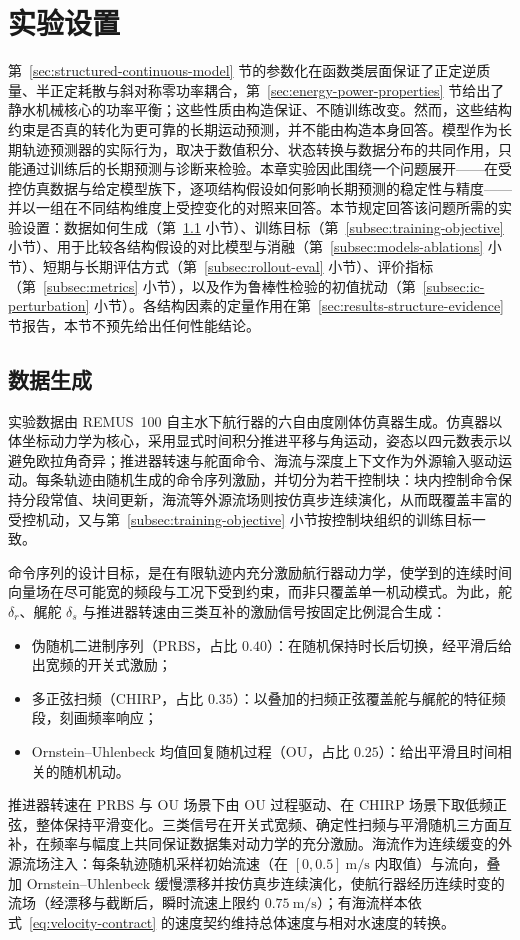 \section{实验设置}
\label{sec:training-baselines-protocol}

第~\ref{sec:structured-continuous-model} 节的参数化在函数类层面保证了正定逆质量、半正定耗散与斜对称零功率耦合，第~\ref{sec:energy-power-properties} 节给出了静水机械核心的功率平衡；这些性质由构造保证、不随训练改变。然而，这些结构约束是否真的转化为更可靠的长期运动预测，并不能由构造本身回答。模型作为长期轨迹预测器的实际行为，取决于数值积分、状态转换与数据分布的共同作用，只能通过训练后的长期预测与诊断来检验。本章实验因此围绕一个问题展开——在受控仿真数据与给定模型族下，逐项结构假设如何影响长期预测的稳定性与精度——并以一组在不同结构维度上受控变化的对照来回答。本节规定回答该问题所需的实验设置：数据如何生成（第~\ref{subsec:data-generation} 小节）、训练目标（第~\ref{subsec:training-objective} 小节）、用于比较各结构假设的对比模型与消融（第~\ref{subsec:models-ablations} 小节）、短期与长期评估方式（第~\ref{subsec:rollout-eval} 小节）、评价指标（第~\ref{subsec:metrics} 小节），以及作为鲁棒性检验的初值扰动（第~\ref{subsec:ic-perturbation} 小节）。各结构因素的定量作用在第~\ref{sec:results-structure-evidence} 节报告，本节不预先给出任何性能结论。

\subsection{数据生成}
\label{subsec:data-generation}

实验数据由 REMUS~100 自主水下航行器的六自由度刚体仿真器生成。仿真器以体坐标动力学为核心，采用显式时间积分推进平移与角运动，姿态以四元数表示以避免欧拉角奇异；推进器转速与舵面命令、海流与深度上下文作为外源输入驱动运动。每条轨迹由随机生成的命令序列激励，并切分为若干控制块：块内控制命令保持分段常值、块间更新，海流等外源流场则按仿真步连续演化，从而既覆盖丰富的受控机动，又与第~\ref{subsec:training-objective} 小节按控制块组织的训练目标一致。

命令序列的设计目标，是在有限轨迹内充分激励航行器动力学，使学到的连续时间向量场在尽可能宽的频段与工况下受到约束，而非只覆盖单一机动模式。为此，舵 \(\delta_r\)、艉舵 \(\delta_s\) 与推进器转速由三类互补的激励信号按固定比例混合生成：
\begin{itemize}
  \item 伪随机二进制序列（PRBS，占比 \(0.40\)）：在随机保持时长后切换，经平滑后给出宽频的开关式激励；
  \item 多正弦扫频（CHIRP，占比 \(0.35\)）：以叠加的扫频正弦覆盖舵与艉舵的特征频段，刻画频率响应；
  \item Ornstein--Uhlenbeck 均值回复随机过程（OU，占比 \(0.25\)）：给出平滑且时间相关的随机机动。
\end{itemize}
推进器转速在 PRBS 与 OU 场景下由 OU 过程驱动、在 CHIRP 场景下取低频正弦，整体保持平滑变化。三类信号在开关式宽频、确定性扫频与平滑随机三方面互补，在频率与幅度上共同保证数据集对动力学的充分激励。海流作为连续缓变的外源流场注入：每条轨迹随机采样初始流速（在 \([0,0.5]~\mathrm{m/s}\) 内取值）与流向，叠加 Ornstein--Uhlenbeck 缓慢漂移并按仿真步连续演化，使航行器经历连续时变的流场（经漂移与截断后，瞬时流速上限约 \(0.75~\mathrm{m/s}\)）；有海流样本依式~\eqref{eq:velocity-contract} 的速度契约维持总体速度与相对水速度的转换。

